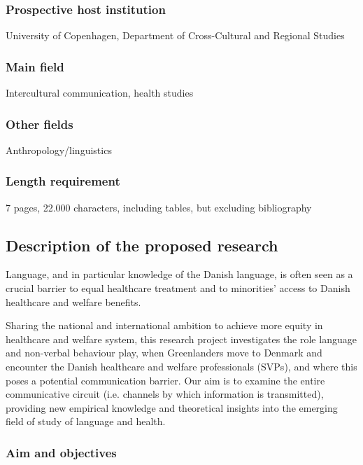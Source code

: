 \documentclass[twocolumn, serif, rga, authordate]{jote-article}
\begin{document}
\subsubsection*{Prospective host institution}


University of Copenhagen, Department of Cross-Cultural and Regional Studies


\subsubsection*{Main field}


Intercultural communication, health studies


\subsubsection*{Other fields}


Anthropology/linguistics


\subsubsection*{Length requirement}


7 pages, 22.000 characters, including tables, but excluding bibliography


\subsection*{Description of the proposed research}


Language, and in particular knowledge of the Danish language, is often seen as a crucial barrier to equal healthcare treatment and to minorities' access to Danish healthcare and welfare benefits.

Sharing the national and international ambition to achieve more equity in healthcare and welfare system, this research project investigates the role language and non-verbal behaviour play, when Greenlanders move to Denmark and encounter the Danish healthcare and welfare professionals
(SVPs), and where this poses a potential communication barrier. Our aim is to examine the entire communicative circuit (i.e. channels by which information is transmitted), providing new empirical knowledge and theoretical insights into the emerging field of study of language and health.


\subsubsection*{Aim and objectives}
\end{document}
